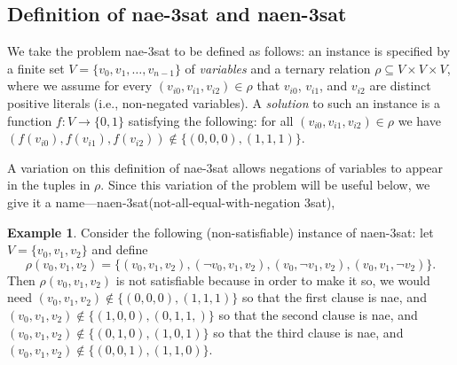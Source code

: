 \documentclass[12pt]{amsart}
\numberwithin{equation}{section}
\theoremstyle{plain}
\theoremstyle{definition}
\newtheorem{example}[theorem]{Example}
\newcommand{\sat}{\acs{sat}\xspace}
\newcommand{\nae}{\acs{nae}\xspace}
\newcommand{\naen}{\acs{naen}\xspace}
\begin{document}
\subsection{Definition of \nae-3\sat and \naen-3\sat}
We take the problem \nae-3\sat to be defined as follows:
an instance is specified by a finite set $V = \{v_0, v_1, \dots, v_{n-1}\}$ of
\emph{variables} and a ternary relation
$\rho \subseteq V \times V \times V$, where 
we assume
for every $(v_{i0}, v_{i1}, v_{i2}) \in \rho$ 
that $v_{i0}$, $v_{i1}$,  and $v_{i2}$ are distinct positive literals
(i.e., non-negated variables).
A \emph{solution} to such an instance %
is a function $f: V \to \{0,1\}$
satisfying the following:
for all $(v_{i0}, v_{i1}, v_{i2}) \in \rho$ we have
$(f(v_{i0}), f(v_{i1}), f(v_{i2})) \notin \{(0,0,0), (1,1,1)\}$.


A variation on this definition of \nae-3\sat allows
negations of variables to appear in the tuples in $\rho$.
Since this variation of the problem will be useful below, we give it a
name---\naen-3\sat (not-all-equal-with-negation 3\sat),

\begin{example}
Consider the following (non-satisfiable)
instance of \naen-3\sat:
let $V= \{v_0, v_1, v_2\}$ and define
\[
\rho(v_0, v_1, v_2) =
\{(v_0, v_1, v_2), (\neg v_0, v_1, v_2), (v_0, \neg v_1, v_2), (v_0,
v_1, \neg v_2)\}.
\]
Then $\rho(v_0, v_1, v_2)$ is not satisfiable because in order to make
it so, we would need
$(v_0, v_1, v_2) \notin \{ (0,0,0), (1,1,1)\}$ so that the
first clause is \nae, and $(v_0, v_1, v_2) \notin \{(1,0,0), (0,1,1,)\}$
so that the second clause is \nae, and 
$(v_0, v_1, v_2) \notin \{ (0,1,0), (1,0,1)\}$ so that the third
clause is \nae, and $(v_0, v_1, v_2) \notin \{(0,0,1), (1,1,0)\}$.
\end{example}
\end{document}
